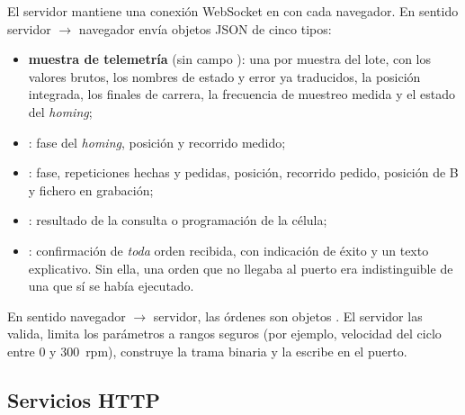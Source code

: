 El servidor mantiene una conexión WebSocket en  con cada navegador. En sentido servidor
$\rightarrow$ navegador envía objetos JSON de cinco tipos:
\begin{itemize}
  \item \textbf{muestra de telemetría} (sin campo ): una por muestra del lote, con los
        valores brutos, los nombres de estado y error ya traducidos, la posición integrada, los
        finales de carrera, la frecuencia de muestreo medida y el estado del \emph{homing};
  \item {}: fase del \emph{homing}, posición y recorrido medido;
  \item {}: fase, repeticiones hechas y pedidas, posición, recorrido pedido, posición de
        B y fichero en grabación;
  \item {}: resultado de la consulta o programación de la célula;
  \item {}: confirmación de \emph{toda} orden recibida, con indicación de éxito y un
        texto explicativo. Sin ella, una orden que no llegaba al puerto era indistinguible de una
        que sí se había ejecutado.
\end{itemize}

En sentido navegador $\rightarrow$ servidor, las órdenes son objetos
 . El servidor las valida, limita los parámetros a
rangos seguros (por ejemplo, velocidad del ciclo entre 0 y \SI{300}{rpm}), construye la trama
binaria y la escribe en el puerto.

\subsection{Servicios HTTP}

